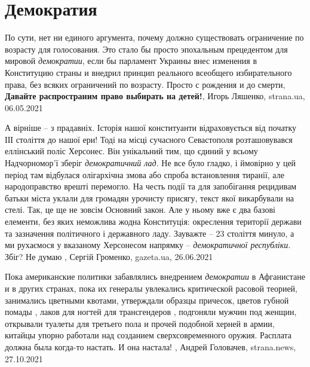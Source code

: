  
 
 
 
 
\chapter{Демократия}
\label{sec:slova.demokratia}

По сути, нет ни единого аргумента, почему должно существовать ограничение по
возрасту для голосования. Это стало бы просто эпохальным прецедентом для
мировой \emph{демократии}, если бы парламент Украины внес изменения в
Конституцию страны и внедрил принцип реального всеобщего избирательного права,
без всяких ограничений по возрасту.  Просто с рождения и до смерти,
\textbf{Давайте распространим право выбирать на детей!},
Игорь Ляшенко, strana.ua, 06.05.2021

А вірніше – з прадавніх. Історія нашої конституанти відраховується від початку
ІІІ століття до нашої ери! Тоді на місці сучасного Севастополя розташовувався
еллінський поліс Херсонес. Він унікальний тим, що єдиний у всьому Надчорномор'ї
зберіг \emph{демократичний лад}. Не все було гладко, і ймовірно у цей період
там відбулася олігархічна змова або спроба встановлення тиранії, але
народоправство врешті перемогло. На честь події та для запобігання рецидивам
батьки міста уклали для громадян урочисту присягу, текст якої викарбували на
стелі. Так, це ще не зовсім Основний закон. Але у ньому вже є два базові
елементи, без яких неможлива жодна Конституція: окреслення території держави та
зазначення політичного і державного ладу.  Зауважте – 23 століття минуло, а ми
рухаємося у вказаному Херсонесом напрямку – \emph{демократичної республіки}.
Збіг? Не думаю
, 
Сергій Громенко, gazeta.ua, 26.06.2021

Пока американские политики забавлялись внедрением \emph{демократии} в Афганистане и в
других странах, пока их генералы увлекались критической расовой теорией,
занимались цветными квотами, утверждали образцы причесок, цветов губной помады
, лаков для ногтей для трансгендеров , подгоняли мужчин под женщин, открывали
туалеты для третьего пола и прочей подобной херней в армии, китайцы упорно
работали над созданием сверхсовременного оружия.  Расплата должна была когда-то
настать. И она настала!
, 
Андрей Головачев, strana.news, 27.10.2021
